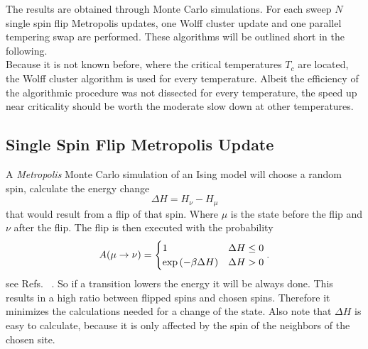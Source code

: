 The results are obtained through Monte Carlo simulations.
For each sweep \(N\) single spin flip Metropolis updates, one
Wolff cluster update and one parallel tempering swap are
performed. These algorithms will be outlined short in the following.\\
Because it is not known before, where the critical temperatures
\(T_c\) are located, the Wolff cluster algorithm is used for
every temperature. Albeit the efficiency of the algorithmic procedure
was not dissected for every temperature, the speed up
near criticality should be worth the moderate slow down at other temperatures.

\subsection{Single Spin Flip Metropolis Update}
    A \emph{Metropolis} Monte Carlo \cite{Metropolis1953} simulation of an
    Ising model will choose a random spin, calculate the energy change
    \begin{equation}
        \Delta H = H_\nu - H_\mu
        \label{eq:dH}
    \end{equation}
    that would result from a flip of that spin. Where \(\mu\) is the
    state before the flip and \(\nu\) after the flip. The flip is then executed
    with the probability
    \begin{equation}
        A(\mu \to \nu) =
        \begin{cases}
            1                            & \Delta H \le 0 \\
            \exp{\ensuremath{\left(-\beta \Delta H\right)}} & \Delta H > 0
        \end{cases}.
        \label{eq:metropolis}
    \end{equation}
    see Refs.\ \cite{NewmanBarkema1999} \cite{Katzgraber2011}.
    So if a transition lowers the energy it will be always done. This
    results in a high ratio between flipped spins and chosen spins.
    Therefore it minimizes the calculations needed for a change of
    the state. Also note that \(\Delta H\) is easy to calculate,
    because it is only affected by the spin of the neighbors of the
    chosen site.

